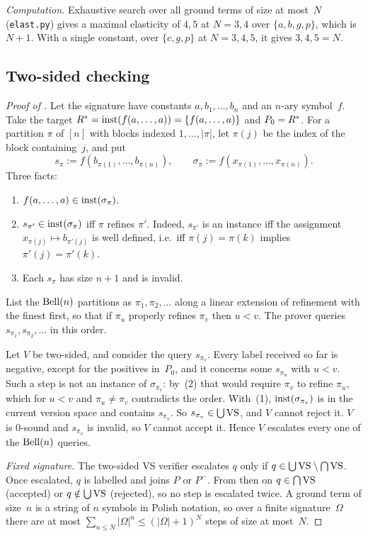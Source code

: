 \emph{Computation.} Exhaustive search over all ground terms of size at most~$N$ (\texttt{elast.py}) gives a maximal elasticity of $4,5$ at $N=3,4$ over $\{a,b,g,p\}$, which is $N+1$. With a single constant, over $\{c,g,p\}$ at $N=3,4,5$, it gives $3,4,5=N$.

\subsection{Two-sided checking}\label{app:caution:bell}

\begin{proof}[Proof of ]
Let the signature have constants $a,b_1,\dots,b_n$ and an $n$-ary symbol~$f$. Take the target $R^{*}=\mathrm{inst}(f(a,\dots,a))=\{f(a,\dots,a)\}$ and $P_0=R^{*}$. For a partition $\pi$ of $[n]$ with blocks indexed $1,\dots,|\pi|$, let $\pi(j)$ be the index of the block containing~$j$, and put
\[
s_\pi:=f(b_{\pi(1)},\dots,b_{\pi(n)}),\qquad\sigma_\pi:=f(x_{\pi(1)},\dots,x_{\pi(n)}).
\]
Three facts:
\begin{enumerate}[label=(\arabic*)]
\item $f(a,\dots,a)\in\mathrm{inst}(\sigma_\pi)$.
\item $s_{\pi'}\in\mathrm{inst}(\sigma_\pi)$ iff $\pi$ refines $\pi'$. Indeed, $s_{\pi'}$ is an instance iff the assignment $x_{\pi(j)}\mapsto b_{\pi'(j)}$ is well defined, i.e.\ iff $\pi(j)=\pi(k)$ implies $\pi'(j)=\pi'(k)$.
\item Each $s_\pi$ has size $n+1$ and is invalid.
\end{enumerate}
List the $\mathrm{Bell}(n)$ partitions as $\pi_1,\pi_2,\dots$ along a linear extension of refinement with the finest first, so that if $\pi_u$ properly refines $\pi_v$ then $u<v$. The prover queries $s_{\pi_1},s_{\pi_2},\dots$ in this order.

Let $V$ be two-sided, and consider the query $s_{\pi_v}$. Every label received so far is negative, except for the positives in~$P_0$, and it concerns some $s_{\pi_u}$ with $u<v$. Such a step is not an instance of $\sigma_{\pi_v}$: by~(2) that would require $\pi_v$ to refine $\pi_u$, which for $u<v$ and $\pi_u\neq\pi_v$ contradicts the order. With~(1), $\mathrm{inst}(\sigma_{\pi_v})$ is in the current version space and contains $s_{\pi_v}$. So $s_{\pi_v}\in\bigcup\mathrm{VS}$, and $V$ cannot reject it. $V$ is $0$-sound and $s_{\pi_v}$ is invalid, so $V$ cannot accept it. Hence $V$ escalates every one of the $\mathrm{Bell}(n)$ queries.

\emph{Fixed signature.} The two-sided VS verifier escalates $q$ only if $q\in\bigcup\mathrm{VS}\setminus\bigcap\mathrm{VS}$. Once escalated, $q$ is labelled and joins $P$ or $P^-$. From then on $q\in\bigcap\mathrm{VS}$ (accepted) or $q\notin\bigcup\mathrm{VS}$ (rejected), so no step is escalated twice. A ground term of size~$n$ is a string of $n$ symbols in Polish notation, so over a finite signature~$\Omega$ there are at most $\sum_{n\le N}|\Omega|^n\le(|\Omega|+1)^N$ steps of size at most~$N$.
\end{proof}

